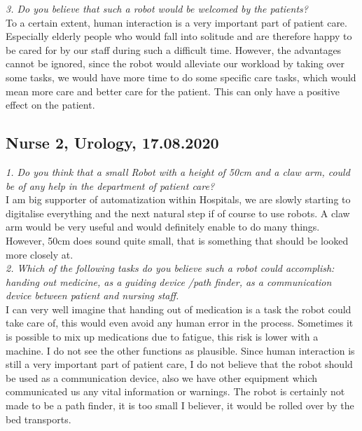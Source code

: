 \documentclass[plainarticle,zihtitle,english,final,hyperref,utf8]{zihpub}
\begin{document}
\begin{appendices}
\newline
\textit{3. Do you believe that such a robot would be welcomed by the patients?}\\
\newline
To a certain extent, human interaction is a very important part of patient care. Especially elderly people who would fall into solitude and are therefore happy to be cared for by our staff during such a difficult time. However, the advantages cannot be ignored, since the robot would alleviate our workload by taking over some tasks, we would have more time to do some specific care tasks, which would mean more care and better care for the patient. This can only have a positive effect on the patient.
\subsection{Nurse 2, Urology, 17.08.2020}
\textit{1. Do you think that a small Robot with a height of 50cm and a claw arm, could be of any help in the department of patient care?}\\
\newline
I am big supporter of automatization within Hospitals, we are slowly starting to digitalise everything and the next natural step if of course to use robots. A claw arm would be very useful and would definitely enable to do many things. However, 50cm does sound quite small, that is something that should be looked more closely at.\\
\newline
\textit{2. Which of the following tasks do you believe such a robot could accomplish: handing out medicine, as a guiding device /path finder, as a communication device between patient and nursing staff.}\\
\newline
I can very well imagine that handing out of medication is a task the robot could take care of, this would even avoid any human error in the process. Sometimes it is possible to mix up medications due to fatigue, this risk is lower with a machine. I do not see the other functions as plausible. Since human interaction is still a very important part of patient care, I do not believe that the robot should be used as a communication device, also we have other equipment which communicated us any vital information or warnings. The robot is certainly not made to be a path finder, it is too small I believer, it would be rolled over by the bed transports. \\


\end{appendices}
\end{document}
